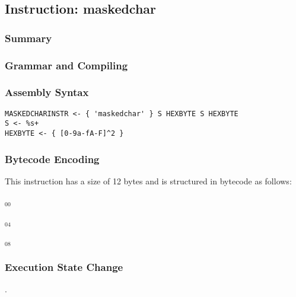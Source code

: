 \subsection{Instruction: maskedchar}

\subsubsection{Summary}


\subsubsection{Grammar and Compiling}


\subsubsection{Assembly Syntax}

\begin{myquote}
\begin{verbatim}
MASKEDCHARINSTR <- { 'maskedchar' } S HEXBYTE S HEXBYTE
S <- %s+
HEXBYTE <- { [0-9a-fA-F]^2 }
\end{verbatim}
\end{myquote}

\subsubsection{Bytecode Encoding}

This instruction has a size of 12 bytes and is structured in bytecode as follows:

$_{00}$\ 



$_{04}$\ 



$_{08}$\ 
\fbox{%
  \parbox{20pt}{%
00
  }%
}


\subsubsection{Execution State Change}

.


